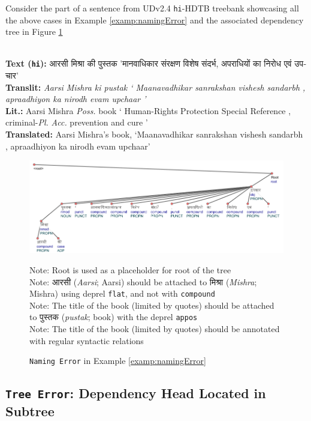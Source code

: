Consider the part of a sentence from UDv2.4 \texttt{hi}-HDTB treebank showcasing all the above cases in Example \ref{examp:namingError} and the associated dependency tree in Figure \ref{examp:namingError-fig}
\begin{example}
\label{examp:namingError}
\textbf{ }\\
\textbf{Text (\texttt{hi}):} \texthindi{आरसी मिश्रा की पुस्तक 'मानवाधिकार संरक्षण विशेष संदर्भ, अपराधियों का निरोध एवं उपचार'}\\
\textbf{Translit:} \textit{Aarsi Mishra ki pustak ` Maanavadhikar sanrakshan vishesh sandarbh , apraadhiyon ka nirodh evam upchaar '}\\
\textbf{Lit.:} Aarsi Mishra \textit{Poss.} book ` Human-Rights Protection Special Reference , criminal-\textit{Pl.} \textit{Acc.} prevention and cure '\\
\textbf{Translated:} Aarsi Mishra's book, `Maanavadhikar sanrakshan vishesh sandarbh , apraadhiyon ka nirodh evam upchaar'
\end{example}

\begin{figure}[H]
    \centering
    \includegraphics[scale=0.60]{img/namingError.png}
    \caption{\texttt{Naming Error} in Example \ref{examp:namingError}}
    Note: Root is used as a placeholder for root of the tree\\
    Note: \texthindi{आरसी} (\textit{Aarsi}; Aarsi) should be attached to \texthindi{मिश्रा} (\textit{Mishra}; Mishra) using deprel \texttt{flat}, and not with \texttt{compound}\\
    Note: The title of the book (limited by quotes) should be attached to \texthindi{पुस्तक} (\textit{pustak}; book) with the deprel \texttt{appos}\\
    Note: The title of the book (limited by quotes) should be annotated with regular syntactic relations
    \label{examp:namingError-fig}
\end{figure}

\subsection[Dependency Head Located in Subtree: \texttt{Tree Error}]{\texttt{Tree Error}: Dependency Head Located in Subtree}

